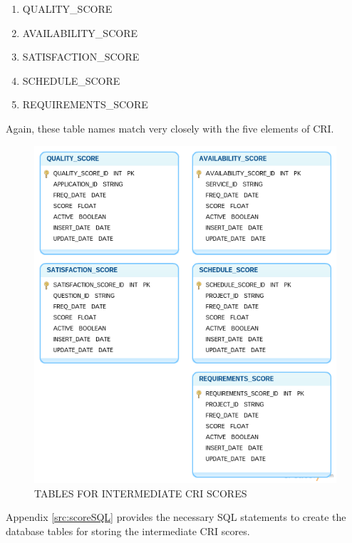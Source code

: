 \documentclass[SDSUThesis.tex]{subfiles}
\begin{document}
            \begin{enumerate}
                \item QUALITY\_SCORE
                \item AVAILABILITY\_SCORE
                \item SATISFACTION\_SCORE
                \item SCHEDULE\_SCORE
                \item REQUIREMENTS\_SCORE
            \end{enumerate}
            Again, these table names match very closely with the five elements of CRI.
        
           \begin{figure}[htb]
                \centering
                \includegraphics[scale=.52]{images/score_tables.png}
                \caption{TABLES FOR INTERMEDIATE CRI SCORES}
                \label{fig:score_tables}
            \end{figure}%
            
            Appendix \ref{src:scoreSQL} provides the necessary SQL statements to create the 
            database tables for storing the intermediate CRI scores.
        
\end{document}
